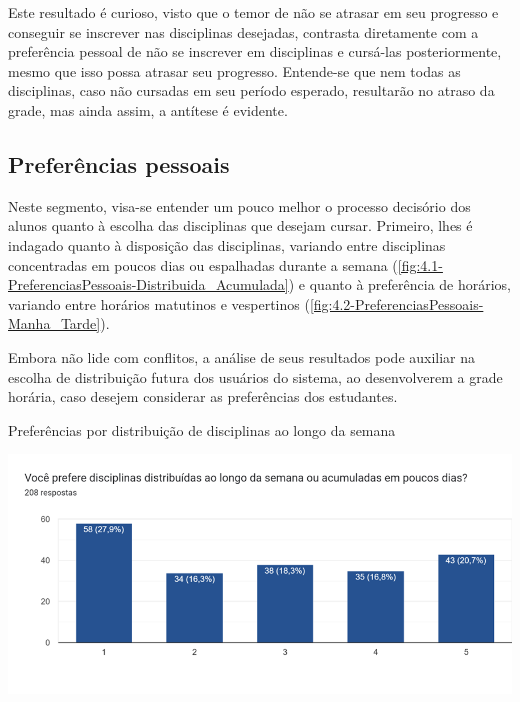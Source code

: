 Este resultado é curioso, visto que o temor de não se atrasar em seu progresso e conseguir se inscrever nas disciplinas desejadas, contrasta diretamente com a preferência pessoal de não se inscrever em disciplinas e cursá-las posteriormente, mesmo que isso possa atrasar seu progresso. Entende-se que nem todas as disciplinas, caso não cursadas em seu período esperado, resultarão no atraso da grade, mas ainda assim, a antítese é evidente.

\subsection{Preferências pessoais} %

Neste segmento, visa-se entender um pouco melhor o processo decisório dos alunos quanto à escolha das disciplinas que desejam cursar. Primeiro, lhes é indagado quanto à disposição das disciplinas, variando entre disciplinas concentradas em poucos dias ou espalhadas durante a semana (\autoref{fig:4.1-PreferenciasPessoais-Distribuida_Acumulada}) e quanto à preferência de horários, variando entre horários matutinos e vespertinos (\autoref{fig:4.2-PreferenciasPessoais-Manha_Tarde}).

Embora não lide com conflitos, a análise de seus resultados pode auxiliar na escolha de distribuição futura dos usuários do sistema, ao desenvolverem a grade horária, caso desejem considerar as preferências dos estudantes.

\begin{MyCenteredFigure}
  \caption{Preferências por distribuição de disciplinas ao longo da semana}
  \label{fig:4.1-PreferenciasPessoais-Distribuida_Acumulada}
  \includegraphics[width=\textwidth]{files/img/Forms/4.1-PreferenciasPessoais-Distribuida_Acumulada}
\end{MyCenteredFigure} %

